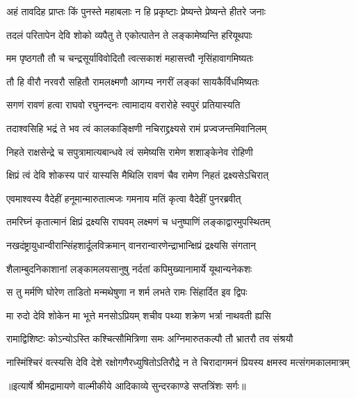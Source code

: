 \twolineshloka
{अहं तावदिह प्राप्तः किं पुनस्ते महाबलाः}
{न हि प्रकृष्टाः प्रेष्यन्ते प्रेष्यन्ते हीतरे जनाः} %

\twolineshloka
{तदलं परितापेन देवि शोको व्यपैतु ते}
{एकोत्पातेन ते लङ्कामेष्यन्ति हरियूथपाः} %

\twolineshloka
{मम पृष्ठगतौ तौ च चन्द्रसूर्याविवोदितौ}
{त्वत्सकाशं महासत्त्वौ नृसिंहावागमिष्यतः} %

\twolineshloka
{तौ हि वीरौ नरवरौ सहितौ रामलक्ष्मणौ}
{आगम्य नगरीं लङ्कां सायकैर्विधमिष्यतः} %

\twolineshloka
{सगणं रावणं हत्वा राघवो रघुनन्दनः}
{त्वामादाय वरारोहे स्वपुरं प्रतियास्यति} %

\twolineshloka
{तदाश्वसिहि भद्रं ते भव त्वं कालकाङ्क्षिणी}
{नचिराद्द्रक्ष्यसे रामं प्रज्वजन्तमिवानिलम्} %

\twolineshloka
{निहते राक्षसेन्द्रे च सपुत्रामात्यबान्धवे}
{त्वं समेष्यसि रामेण शशाङ्केनेव रोहिणी} %

\twolineshloka
{क्षिप्रं त्वं देवि शोकस्य पारं यास्यसि मैथिलि}
{रावणं चैव रामेण निहतं द्रक्ष्यसेऽचिरात्} %

\twolineshloka
{एवमाश्वस्य वैदेहीं हनूमान्मारुतात्मजः}
{गमनाय मतिं कृत्वा वैदेहीं पुनरब्रवीत्} %

\twolineshloka
{तमरिघ्नं कृतात्मानं क्षिप्रं द्रक्ष्यसि राघवम्}
{लक्ष्मणं च धनुष्पाणिं लङ्काद्वारमुपस्थितम्} %

\twolineshloka
{नखदंष्ट्रायुधान्वीरान्सिंहशार्दूलविक्रमान्}
{वानरान्वारणेन्द्राभान्क्षिप्रं द्रक्ष्यसि संगतान्} %

\twolineshloka
{शैलाम्बुदनिकाशानां लङ्कामलयसानुषु}
{नर्दतां कपिमुख्यानामार्ये यूथान्यनेकशः} %

\twolineshloka
{स तु मर्मणि घोरेण ताडितो मन्मथेषुणा}
{न शर्म लभते रामः सिंहार्दित इव द्विपः} %

\twolineshloka
{मा रुदो देवि शोकेन मा भूत्ते मनसोऽप्रियम्}
{शचीव पथ्या शक्रेण भर्त्रा नाथवती ह्यसि} %

\twolineshloka
{रामाद्विशिष्टः कोऽन्योऽस्ति कश्चित्सौमित्रिणा समः}
{अग्निमारुतकल्पौ तौ भ्रातरौ तव संश्रयौ} %

\fourlineindentedshloka
{नास्मिंश्चिरं वत्स्यसि देवि देशे}
{ रक्षोगणैरध्युषितोऽतिरौद्रे}
{न ते चिरादागमनं प्रियस्य}
{ क्षमस्व मत्संगमकालमात्रम्} %


{॥इत्यार्षे श्रीमद्रामायणे वाल्मीकीये आदिकाव्ये सुन्दरकाण्डे सप्तत्रिंशः सर्गः॥}

